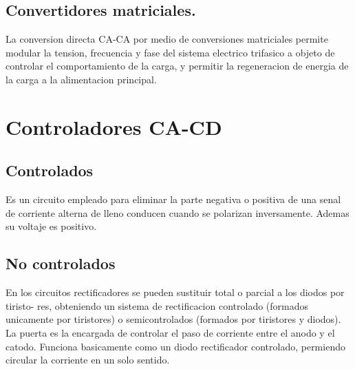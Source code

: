 \documentclass[11pt]{article}
\begin{document}
\subsection{Convertidores matriciales.}
La conversion directa CA-CA por medio de conversiones matriciales permite modular la
tension, frecuencia y fase del sistema electrico trifasico a objeto de controlar el comportamiento
de la carga, y permitir la regeneracion de energia de la carga a la alimentacion principal.
\section{Controladores CA-CD}
\subsection{Controlados}
Es un circuito empleado para eliminar la parte negativa o positiva de una senal de corriente
alterna de lleno conducen cuando se polarizan inversamente. Ademas su voltaje es positivo.
\subsection{No controlados}
En los circuitos rectificadores se pueden sustituir total o parcial a los diodos por tiristo-
res, obteniendo un sistema de rectificacion controlado (formados unicamente por tiristores) o
semicontrolados (formados por tiristores y diodos). La puerta es la encargada de controlar el
paso de corriente entre el anodo y el catodo. Funciona basicamente como un diodo rectificador
controlado, permiendo circular la corriente en un solo sentido.
\end{document}
